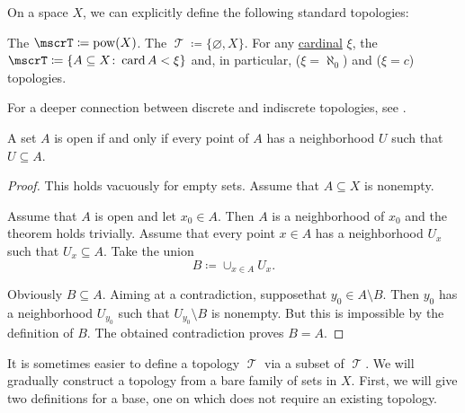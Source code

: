 \begin{definition}\label{def:standard_topologies}
  On a space \( X \), we can explicitly define the following standard topologies:
  \begin{thmenum}
     The  \( \mscrT \coloneqq \pow(X) \).
     The  \( \mscrT \coloneqq \{ \varnothing, X \} \).
     For any \hyperref[def:cardinal]{cardinal} \( \xi \), the  \( \mscrT \coloneqq \{ A \subseteq X \colon \card A < \xi \} \) and, in particular,  (\( \xi = \aleph_0 \)) and  (\( \xi = c \)) topologies.
  \end{thmenum}

  For a deeper connection between discrete and indiscrete topologies, see .
\end{definition}

\begin{proposition}\label{thm:set_open_iff_neighborhood_is_contained}
  A set \( A \) is open if and only if every point of \( A \) has a neighborhood \( U \) such that \( U \subseteq A \).
\end{proposition}
\begin{proof}
  This holds vacuously for empty sets. Assume that \( A \subseteq X \) is nonempty.

  \SufficiencySubProof Assume that \( A \) is open and let \( x_0 \in A \). Then \( A \) is a neighborhood of \( x_0 \) and the theorem holds trivially.
  \NecessitySubProof Assume that every point \( x \in A \) has a neighborhood \( U_x \) such that \( U_x \subseteq A \). Take the union
  \begin{equation*}
    B \coloneqq \cup_{x \in A} U_x.
  \end{equation*}

  Obviously \( B \subseteq A \). Aiming at a contradiction, suppose\LEM that \( y_0 \in A \setminus B \). Then \( y_0 \) has a neighborhood \( U_{y_0} \) such that \( U_{y_0} \setminus B \) is nonempty. But this is impossible by the definition of \( B \). The obtained contradiction proves \( B = A \).
\end{proof}

\begin{remark}\label{rem:abritrary_family_to_topology}
  It is sometimes easier to define a topology \( \mscrT \) via a subset of \( \mscrT \). We will gradually construct a topology from a bare family of sets in \( X \). First, we will give two definitions for a base, one on which does not require an existing topology.
\end{remark}

